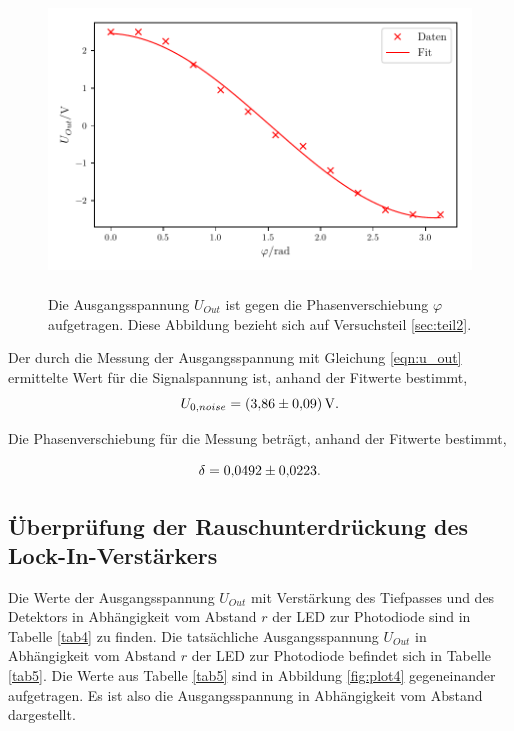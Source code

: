 \begin{figure}
    \centering
    \includegraphics[width=12cm, height=8cm]{build/plot3.pdf}
    \caption{Die Ausgangsspannung $U_{Out}$ ist gegen die Phasenverschiebung $\varphi$ aufgetragen.
    Diese Abbildung bezieht sich auf Versuchsteil \ref{sec:teil2}.}
    \label{fig:plot3}
\end{figure}

\noindent Der durch die Messung der Ausgangsspannung mit Gleichung \eqref{eqn:u_out} ermittelte Wert für die Signalspannung ist, anhand der Fitwerte bestimmt,
\begin{equation*}
    U_{0,noise} = \SI{3.86 \pm 0.09}{\volt}.
\end{equation*}

\noindent Die Phasenverschiebung für die Messung beträgt, anhand der Fitwerte bestimmt, 

\begin{equation*}
    \delta = \num{0.0492 \pm 0.0223}.
\end{equation*}

\subsection{Überprüfung der Rauschunterdrückung des Lock-In-Verstärkers}
Die Werte der Ausgangsspannung $U_{Out}$ mit Verstärkung des Tiefpasses und des Detektors in Abhängigkeit vom Abstand $r$ der LED
zur Photodiode sind in Tabelle \ref{tab4} zu finden.
Die tatsächliche Ausgangsspannung $U_{Out}$ in Abhängigkeit vom Abstand $r$ der LED
zur Photodiode befindet sich in Tabelle \ref{tab5}.
Die Werte aus Tabelle \ref{tab5} sind in Abbildung \ref{fig:plot4}
gegeneinander aufgetragen. Es ist also die Ausgangsspannung in Abhängigkeit
vom Abstand dargestellt.



